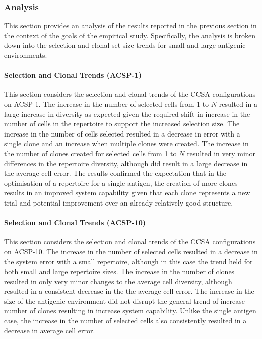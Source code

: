 %
%
\subsubsection{Analysis}
This section provides an analysis of the results reported in the previous section in the context of the goals of the empirical study. Specifically, the analysis is broken down into the selection and clonal set size trends for small and large antigenic environments.

%
% 
\paragraph{Selection and Clonal Trends (ACSP-1)}
This section considers the selection and clonal trends of the CCSA configurations on ACSP-1.
The increase in the number of selected cells from 1 to $N$ resulted in a large increase in diversity as expected given the required shift in increase in the number of cells in the repertoire to support the increased selection size. The increase in the number of cells selected resulted in a decrease in error with a single clone and an increase when multiple clones were created.
The increase in the number of clones created for selected cells from 1 to $N$ resulted in very minor differences in the repertoire diversity, although did result in a large decrease in the average cell error.
The results confirmed the expectation that in the optimisation of a repertoire for a single antigen, the creation of more clones results in an improved system capability given that each clone represents a new trial and potential improvement over an already relatively good structure. 

%
% 
\paragraph{Selection and Clonal Trends (ACSP-10)}
This section considers the selection and clonal trends of the CCSA configurations on ACSP-10. 
The increase in the number of selected cells resulted in a decrease in the system error with a small repertoire, although in this case the trend held for both small and large repertoire sizes. 
The increase in the number of clones resulted in only very minor changes to the average cell diversity, although resulted in a consistent decrease in the the average cell error.
The increase in the size of the antigenic environment did not disrupt the general trend of increase number of clones resulting in increase system capability. Unlike the single antigen case, the increase in the number of selected cells also consistently resulted in a decrease in average cell error. 


